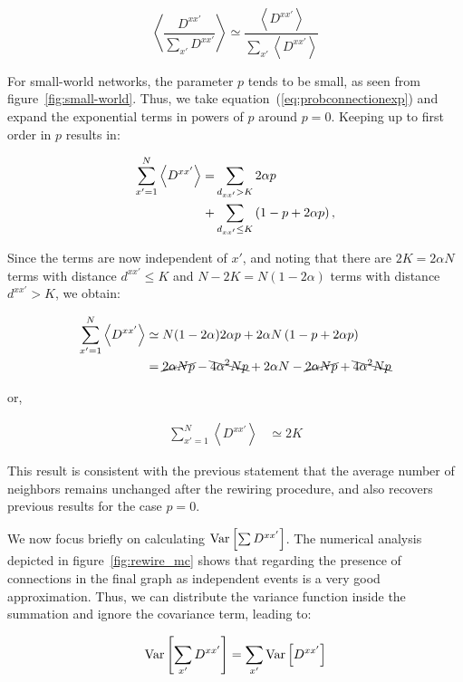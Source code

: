 \begin{equation}
    \left< \frac{D^{xx'}}{\sum_{x'}D^{xx'}} \right> \simeq \frac{\left< D^{xx'} \right>}{\sum_{x'}\left< D^{xx'} \right>}
    \label{eq:avgquotient}
\end{equation}

\noindent For small-world networks, the parameter $p$ tends to be small\cite{rodrigues2020synchronization}, as seen from
figure~\ref{fig:small-world}. Thus, we take equation~(\ref{eq:probconnectionexp}) and expand the exponential terms in powers of $p$
around $p=0$. Keeping up to first order in $p$ results in:

\begin{align}
  \sum_{x'=1}^N \left< D^{xx'} \right> = &
  \sum_{d_{xx'}>K} 2\alpha p \notag \\
  + &
  \sum_{d_{xx'}\leq K} \left( 1 - p + 2\alpha p \right),
\end{align}

Since the terms are now independent of $x'$, and noting that there are $2K=2\alpha N$ terms with distance $d^{xx'}\leq K$ and
$N-2K=N(1-2\alpha)$ terms with distance $d^{xx'}>K$, we obtain:

\begin{align}
  \sum_{x'=1}^N \left< D^{xx'} \right> &\simeq N(1-2\alpha)2\alpha p + 2\alpha N\left( 1 - p + 2\alpha p \right) \notag\\
  &= \cancel{2\alpha Np} - \bcancel{4\alpha^2Np} + 2\alpha N - \cancel{2\alpha Np} + \bcancel{4\alpha^2Np}
\end{align}

\noindent or,

\begin{align}
  \sum_{x'=1}^N \left< D^{xx'} \right> &\simeq 2K
\end{align}

This result is consistent with the previous statement that the average
number of neighbors remains unchanged after the rewiring procedure, and also recovers previous results\cite{escaff2014arrays} for the
case $p=0$.

We now focus briefly on calculating $\text{Var}\left[{\sum D^{xx'}}\right]$. The numerical analysis depicted in figure~\ref{fig:rewire_mc} shows that
regarding the presence of connections in the final graph as independent events is a very good approximation. Thus, we can distribute
the variance function inside the summation and ignore the covariance term, leading to:

\begin{equation}
  \text{Var}\left[{\sum_{x'}D^{xx'}}\right] = \sum_{x'} \text{Var}\left[{D^{xx'}}\right]
\end{equation}

